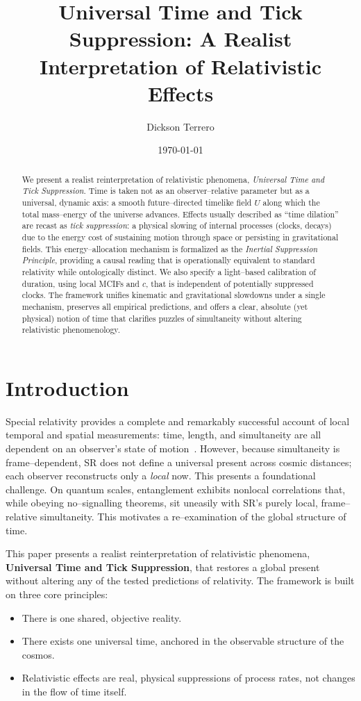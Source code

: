 \documentclass[12pt]{article}
\title{Universal Time and Tick Suppression: A Realist Interpretation of Relativistic Effects}
\author{Dickson Terrero}
\date{\today}
\theoremstyle{plain}
\begin{document}
\maketitle
\begin{abstract}
We present a realist reinterpretation of relativistic phenomena, \emph{Universal Time and Tick Suppression}. Time is taken not as an observer–relative parameter but as a universal, dynamic axis: a smooth future–directed timelike field \(U\) along which the total mass–energy of the universe advances. Effects usually described as “time dilation” are recast as \emph{tick suppression}: a physical slowing of internal processes (clocks, decays) due to the energy cost of sustaining motion through space or persisting in gravitational fields. This energy–allocation mechanism is formalized as the \emph{Inertial Suppression Principle}, providing a causal reading that is operationally equivalent to standard relativity while ontologically distinct. We also specify a light–based calibration of duration, using local MCIFs and \(c\), that is independent of potentially suppressed clocks. The framework unifies kinematic and gravitational slowdowns under a single mechanism, preserves all empirical predictions, and offers a clear, absolute (yet physical) notion of time that clarifies puzzles of simultaneity without altering relativistic phenomenology.
\end{abstract}

\section*{Introduction}

Special relativity provides a complete and remarkably successful account of local temporal and spatial measurements: time, length, and simultaneity are all dependent on an observer's state of motion~\cite{Einstein1905}. However, because simultaneity is frame–dependent, SR does not define a universal present across cosmic distances; each observer reconstructs only a \emph{local} now. This presents a foundational challenge. On quantum scales, entanglement exhibits nonlocal correlations that, while obeying no–signalling theorems, sit uneasily with SR's purely local, frame–relative simultaneity. This motivates a re–examination of the global structure of time.

\medskip
\noindent
This paper presents a realist reinterpretation of relativistic phenomena, \textbf{Universal Time and Tick Suppression}, that restores a global present without altering any of the tested predictions of relativity. The framework is built on three core principles:
\begin{itemize}
    \item There is one shared, objective reality.
    \item There exists one universal time, anchored in the observable structure of the cosmos.
    \item Relativistic effects are real, physical suppressions of process rates, not changes in the flow of time itself.
\end{itemize}
\end{document}
